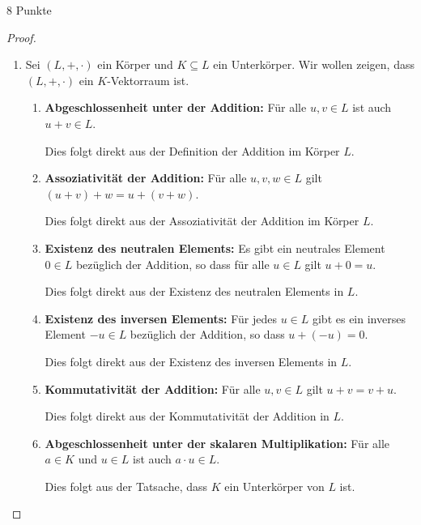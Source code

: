 \documentclass{problemset}
\begin{document}
\begin{problem}{8 Punkte}
\begin{proof}
    \begin{enumerate}
        \item Sei $(L, +, \cdot)$ ein Körper und $K \subseteq L$ ein
              Unterkörper. Wir wollen zeigen, dass $(L, +, \cdot)$ ein
              $K$-Vektorraum ist.

              \begin{enumerate}
                  \item \textbf{Abgeschlossenheit unter der Addition:} Für alle $u, v \in L$ ist auch $u + v \in L$.

                        Dies folgt direkt aus der Definition der Addition im
                        Körper $L$.

                  \item \textbf{Assoziativität der Addition:} Für alle $u, v, w \in L$ gilt $(u + v) + w = u + (v + w)$.

                        Dies folgt direkt aus der Assoziativität der Addition
                        im Körper $L$.

                  \item \textbf{Existenz des neutralen Elements:} Es gibt ein neutrales Element $0 \in L$ bezüglich der Addition, so dass für alle $u \in L$ gilt $u + 0 = u$.

                        Dies folgt direkt aus der Existenz des neutralen
                        Elements in $L$.

                  \item \textbf{Existenz des inversen Elements:} Für jedes $u \in L$ gibt es ein inverses Element $-u \in L$ bezüglich der Addition, so dass $u + (-u) = 0$.

                        Dies folgt direkt aus der Existenz des inversen
                        Elements in $L$.

                  \item \textbf{Kommutativität der Addition:} Für alle $u, v \in L$ gilt $u + v = v + u$.

                        Dies folgt direkt aus der Kommutativität der Addition
                        in $L$.

                  \item \textbf{Abgeschlossenheit unter der skalaren Multiplikation:} Für alle $a \in K$ und $u \in L$ ist auch $a \cdot u \in L$.

                        Dies folgt aus der Tatsache, dass $K$ ein Unterkörper
                        von $L$ ist.


\end{enumerate}
\end{enumerate}
\end{proof}
\end{problem}
\end{document}
